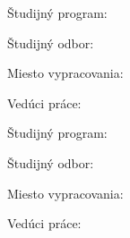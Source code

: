 

Študijný program: \myStudyProgram

Študijný odbor: \myDegreeCourse

Miesto vypracovania: \myInstitute

Vedúci práce: \mySupervisor

\medskip{}
\myDate


\newpage
\thispagestyle{empty}
\mbox{}
\newpage





Študijný program: \myStudyProgram

Študijný odbor: \myDegreeCourse

Miesto vypracovania: \myInstitute

Vedúci práce: \mySupervisor

\medskip{}

\myDate


\newpage
\thispagestyle{empty}
\mbox{}
\newpage

